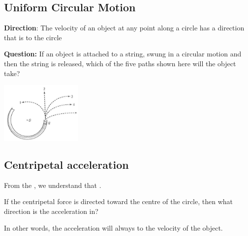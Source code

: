 \subsection{Uniform Circular Motion}
\begin{redblock}
    \textbf{Direction}: The velocity of an object at any point along a circle has a direction that is 
     to the circle
\end{redblock}

\begin{paracol}{2}
    \begin{leftcolumn}
        \textbf{Question:} If an object is attached to a string, swung in a circular motion and then the string is released,
        which of the five paths shown here will the object take?\\
    \end{leftcolumn}

    \begin{rightcolumn}
        \begin{center}
            \includegraphics[width=0.3\textwidth]{graph/circularMotion.png}
        \end{center}
    \end{rightcolumn}
\end{paracol}

\subsection{Centripetal acceleration}
From the , we understand that .

If the centripetal force is directed toward the centre of the circle, then what direction is the acceleration in?

In other words, the acceleration will always  to the velocity of the object.

